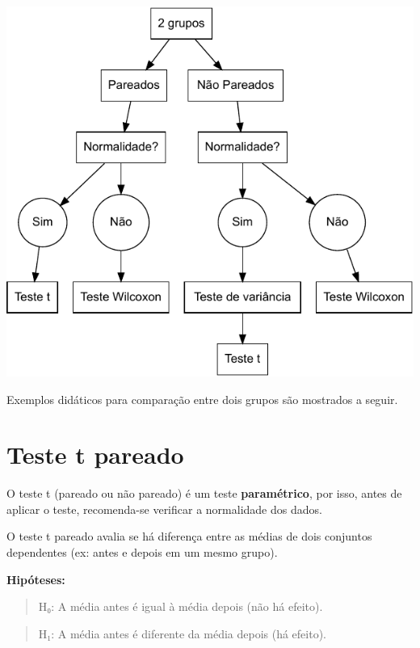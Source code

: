 \documentclass[
]{book}
\begin{document}
\includegraphics{LivroEstatisticaR_files/figure-latex/fluxograma2gr-1.pdf}

Exemplos didáticos para comparação entre dois grupos são mostrados a seguir.

\section{Teste t pareado}\label{teste-t-pareado}

O teste t (pareado ou não pareado) é um teste \textbf{paramétrico}, por isso, antes de aplicar o teste, recomenda-se verificar a normalidade dos dados.

O teste t pareado avalia se há diferença entre as médias de dois conjuntos dependentes (ex: antes e depois em um mesmo grupo).

\textbf{Hipóteses:}

\begin{quote}
H₀: A média antes é igual à média depois (não há efeito).
\end{quote}

\begin{quote}
H₁: A média antes é diferente da média depois (há efeito).
\end{quote}
\end{document}
